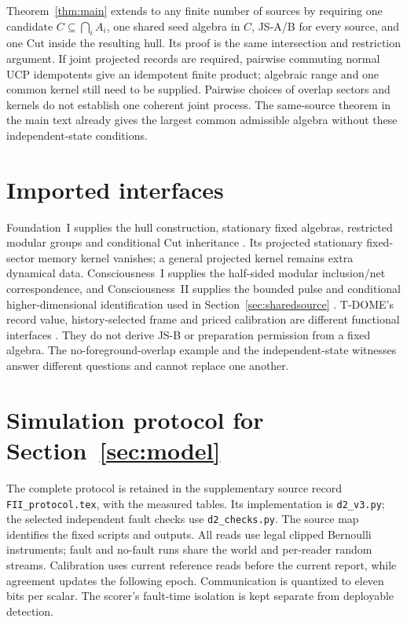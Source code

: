 \documentclass[12pt]{article}
\theoremstyle{definition}
\theoremstyle{remark}
\begin{document}
Theorem~\ref{thm:main} extends to any finite number of sources by
requiring one candidate \(C\subseteq\bigcap_iA_i\), one shared seed
algebra in \(C\), JS-A/B for every source, and one Cut inside the
resulting hull. Its proof is the same intersection and restriction
argument. If joint projected records are required, pairwise commuting
normal UCP idempotents give an idempotent finite product; algebraic
range and one common kernel still need to be supplied. Pairwise choices
of overlap sectors and kernels do not establish one coherent joint
process. The same-source theorem in the main text already gives the
largest common admissible algebra without these independent-state
conditions.

\section{Imported interfaces}\label{app:premises}

Foundation~I supplies the hull construction, stationary fixed
algebras, restricted modular groups and conditional Cut inheritance
\cite{FoundationI}. Its projected stationary fixed-sector memory
kernel vanishes; a general projected kernel remains extra dynamical
data. Consciousness~I supplies the half-sided modular inclusion/net
correspondence, and Consciousness~II supplies the bounded pulse and
conditional higher-dimensional identification used in
Section~\ref{sec:sharedsource} \cite{PaperI,PaperII}.
T-DOME's record value, history-selected frame and priced calibration
are different functional interfaces \cite{TDOMEI,TDOMEII,TDOMEIII}.
They do not derive JS-B or preparation permission from a fixed
algebra. The no-foreground-overlap example and the independent-state
witnesses answer different questions and cannot replace one another.
 
\section{Simulation protocol for Section~\ref{sec:model}}\label{app:protocol}

The complete protocol is retained in the supplementary source record
\texttt{FII\_protocol.tex}, with the measured tables.
Its implementation is \texttt{d2\_v3.py}; the selected independent
fault checks use \texttt{d2\_checks.py}. The source map identifies the
fixed scripts and outputs. All reads use legal clipped Bernoulli
instruments; fault and no-fault runs share the world and per-reader
random streams. Calibration uses current reference reads before the
current report, while agreement updates the following epoch.
Communication is quantized to eleven bits per scalar. The scorer's
fault-time isolation is kept separate from deployable detection.
\end{document}
